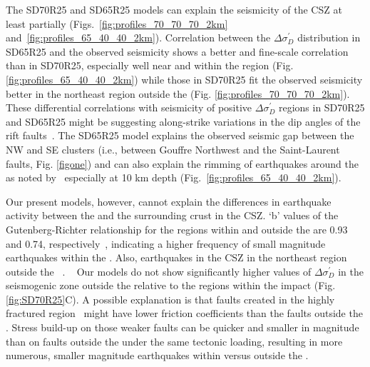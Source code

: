 \documentclass[draft]{agujournal2018}
\begin{document}
The SD70R25 and SD65R25 models can explain the seismicity of the CSZ at least partially (Figs.~\ref{fig:profiles_70_70_70_2km} and~\ref{fig:profiles_65_40_40_2km}). Correlation between the $\Delta\sigma_{D}^{\prime}$ distribution in SD65R25 and the observed seismicity shows a better and fine-scale correlation than in SD70R25, especially well near and within the  region (Fig. \ref{fig:profiles_65_40_40_2km}) while those in SD70R25 fit the observed seismicity better in the northeast region outside the  (Fig. \ref{fig:profiles_70_70_70_2km}). These differential correlations with seismicity of positive $\Delta \sigma_{D}^{\prime}$ regions in SD70R25 and SD65R25 might be suggesting along-strike variations in the dip angles of the rift faults~\citep[e.g.,][]{Baird_2010}. The SD65R25 model explains the observed seismic gap between the NW and SE clusters (i.e., between Gouffre Northwest and the Saint-Laurent faults, Fig. \ref{figone}) and can also explain the rimming of earthquakes around the  as noted by~\citet{Powell_2017} especially at 10 km depth (Fig.~\ref{fig:profiles_65_40_40_2km}). 

Our present models, however, cannot explain the differences in earthquake activity between the  and the surrounding crust in the CSZ. `b' values of the Gutenberg-Richter relationship for the regions within and outside the  are 0.93 and 0.74, respectively~\citep{Yu_2016}, indicating a higher frequency of small magnitude earthquakes within the . Also,  earthquakes in the CSZ  in the northeast region outside the ~\citep[e.g.,][]{lamontagne1999,Powell_2017,Baird_2010}. ~\citet{Stevens1980}  Our models do not show significantly higher values of $\Delta\sigma_{D}^\prime$ in the seismogenic zone outside the  relative to the regions within the impact  (Fig. \ref{fig:SD70R25}C). A possible explanation is that faults created in the highly fractured  region~\citep{RONDOT_2000} might have lower friction coefficients than the faults outside the . Stress build-up on those weaker  faults can be quicker and smaller in magnitude than on faults outside the  under the same tectonic loading, resulting in more numerous, smaller magnitude earthquakes within versus outside the .
\end{document}
